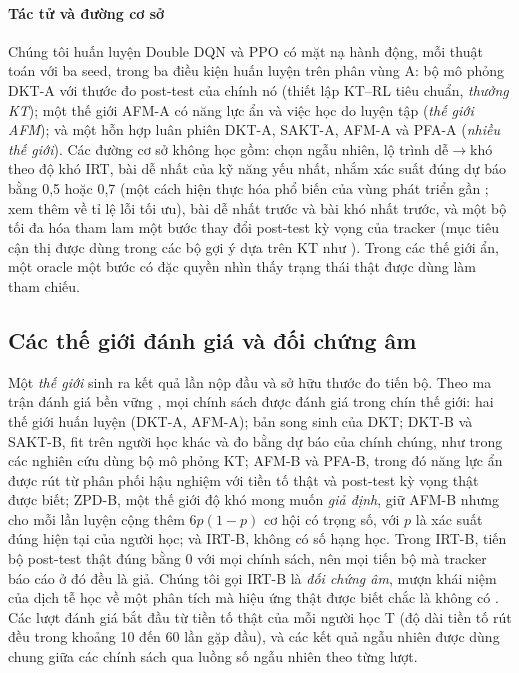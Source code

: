 \paragraph{Tác tử và đường cơ sở} Chúng tôi huấn luyện Double DQN \citep{mnih2015dqn,vanhasselt2016ddqn} và PPO \citep{schulman2017ppo} có mặt nạ hành động, mỗi thuật toán với ba seed, trong ba điều kiện huấn luyện trên phân vùng A: bộ mô phỏng DKT-A với thước đo post-test của chính nó (thiết lập KT--RL tiêu chuẩn, \emph{thưởng KT}); một thế giới AFM-A có năng lực ẩn và việc học do luyện tập (\emph{thế giới AFM}); và một hỗn hợp luân phiên DKT-A, SAKT-A, AFM-A và PFA-A (\emph{nhiều thế giới}). Các đường cơ sở không học gồm: chọn ngẫu nhiên, lộ trình dễ$\to$khó theo độ khó IRT, bài dễ nhất của kỹ năng yếu nhất, nhắm xác suất đúng dự báo bằng 0,5 hoặc 0,7 (một cách hiện thực hóa phổ biến của vùng phát triển gần \citep{vygotsky1978mind}; xem thêm \citealp{wilson2019eighty} về tỉ lệ lỗi tối ưu), bài dễ nhất trước và bài khó nhất trước, và một bộ tối đa hóa tham lam một bước thay đổi post-test kỳ vọng của tracker (mục tiêu cận thị được dùng trong các bộ gợi ý dựa trên KT như \citet{ozyurt2025exrec}). Trong các thế giới ẩn, một oracle một bước có đặc quyền nhìn thấy trạng thái thật được dùng làm tham chiếu.

\subsection{Các thế giới đánh giá và đối chứng âm}\label{sec:worlds}

Một \emph{thế giới} sinh ra kết quả lần nộp đầu và sở hữu thước đo tiến bộ. Theo ma trận đánh giá bền vững \citep{doroudi2017rem}, mọi chính sách được đánh giá trong chín thế giới: hai thế giới huấn luyện (DKT-A, AFM-A); bản song sinh của DKT; DKT-B và SAKT-B, fit trên người học khác và đo bằng dự báo của chính chúng, như trong các nghiên cứu dùng bộ mô phỏng KT; AFM-B và PFA-B, trong đó năng lực ẩn được rút từ phân phối hậu nghiệm với tiền tố thật và post-test kỳ vọng thật được biết; ZPD-B, một thế giới độ khó mong muốn \emph{giả định}, giữ AFM-B nhưng cho mỗi lần luyện cộng thêm $6p(1-p)$ cơ hội có trọng số, với $p$ là xác suất đúng hiện tại của người học; và IRT-B, không có số hạng học. Trong IRT-B, tiến bộ post-test thật đúng bằng 0 với mọi chính sách, nên mọi tiến bộ mà tracker báo cáo ở đó đều là giả. Chúng tôi gọi IRT-B là \emph{đối chứng âm}, mượn khái niệm của dịch tễ học về một phân tích mà hiệu ứng thật được biết chắc là không có \citep{lipsitch2010negative,arnold2016negative}. Các lượt đánh giá bắt đầu từ tiền tố thật của mỗi người học T (độ dài tiền tố rút đều trong khoảng 10 đến 60 lần gặp đầu), và các kết quả ngẫu nhiên được dùng chung giữa các chính sách qua luồng số ngẫu nhiên theo từng lượt.

